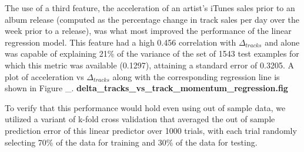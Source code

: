 \documentclass[conference]{IEEEtran}
\begin{document}
The use of a third feature, the acceleration of an artist's iTunes sales prior to an album release (computed as the percentage change in track sales per day over the week prior to a release), was what most improved the performance of the linear regression model. This feature had a high 0.456 correlation with $\Delta_{tracks}$ and alone was capable of explaining 21\% of the variance of the set of 1543 test examples for which this metric was available (0.1297), attaining a standard error of 0.3205. A plot of acceleration vs $\Delta_{tracks}$ along with the corresponding regression line is shown in Figure \_. \textbf{delta\_tracks\_vs\_track\_momentum\_regression.fig}

To verify that this performance would hold even using out of sample data, we utilized a variant of k-fold cross validation that averaged the out of sample prediction error of this linear predictor over 1000 trials, with each trial randomly selecting 70\% of the data for training and 30\% of the data for testing.
\end{document}
